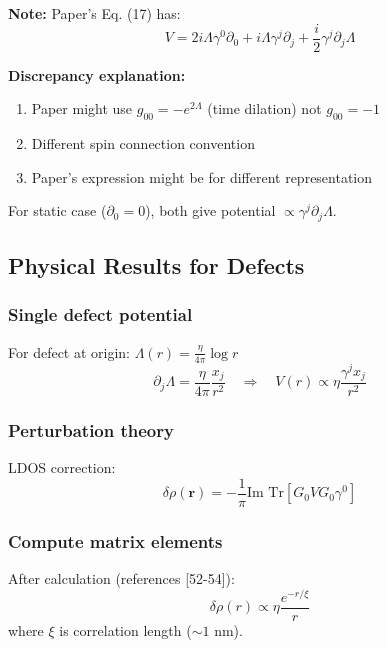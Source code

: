 \documentclass[12pt]{article}
\begin{document}
\textbf{Note:} Paper's Eq. (17) has:
\begin{equation}
    V = 2i\Lambda\gamma^0\partial_0 + i\Lambda\gamma^j\partial_j + \frac{i}{2}\gamma^j\partial_j\Lambda
    \tag{Eq. 17}
\end{equation}

\textbf{Discrepancy explanation:}
\begin{enumerate}
    \item Paper might use $g_{00} = -e^{2\Lambda}$ (time dilation) not $g_{00} = -1$
    \item Different spin connection convention
    \item Paper's expression might be for different representation
\end{enumerate}

For static case ($\partial_0 = 0$), both give potential $\propto \gamma^j\partial_j\Lambda$.

\subsection{Physical Results for Defects}

\subsubsection{Single defect potential}
For defect at origin: $\Lambda(r) = \frac{\eta}{4\pi} \log r$
\begin{equation}
    \partial_j \Lambda = \frac{\eta}{4\pi} \frac{x_j}{r^2} \quad \Rightarrow \quad V(r) \propto \eta \frac{\gamma^j x_j}{r^2}
\end{equation}

\subsubsection{Perturbation theory}
LDOS correction:
\begin{equation}
    \delta\rho(\mathbf{r}) = -\frac{1}{\pi} \text{Im Tr}[G_0 V G_0 \gamma^0]
\end{equation}

\subsubsection{Compute matrix elements}
After calculation (references [52-54]):
\begin{equation}
    \delta\rho(r) \propto \eta \frac{e^{-r/\xi}}{r}
\end{equation}
where $\xi$ is correlation length ($\sim 1$ nm).
\end{document}
